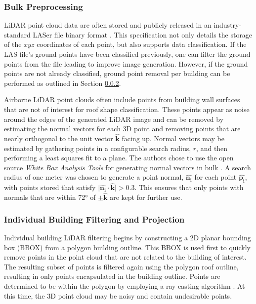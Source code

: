 \subsubsection{Bulk Preprocessing}\label{section:lidar_preprocess}
{LiDAR point cloud data are often stored and publicly released in an industry-standard LASer file binary format \cite{noauthor_laser_2018}. This specification not only details the storage of the $xyz$ coordinates of each point, but also supports data classification. If the LAS file's ground points have been classified previously, one can filter the ground points from the file leading to improve image generation.} However, if the ground points are not already classified, ground point removal per building can be performed as outlined in Section \ref{section:lidar_filtering}.

{Airborne LiDAR point clouds often include points from building wall surfaces that are not of interest for roof shape classification. These points appear as noise around the edges of the generated LiDAR image and can be removed by estimating the normal vectors for each 3D point and removing points that are nearly orthogonal to the unit vector $\boldsymbol{\hat{k}}$  facing up. Normal vectors may be estimated by gathering points in a configurable search radius, $r$, and then performing a least squares fit to a plane.  The authors chose to use the open source \emph{White Box Analysis Tools} for generating normal vectors in bulk \cite{lindsay_whitebox_2016}.  A search radius of one meter was chosen to generate a point normal, $\boldsymbol{\hat{n_i}}$ for each point $\boldsymbol{\hat{p_i}}$, with points stored that satisfy $\big| \boldsymbol{\hat{n_i}} \cdot \boldsymbol{\hat{\textbf{k}}}\big| > 0.3$. This ensures that only points with normals that are within \ang{72} of $\pm \hat{\textbf{k}}$ are kept for further use.   }


\subsubsection{Individual Building Filtering and Projection}\label{section:lidar_filtering}

Individual building LiDAR filtering begins by constructing a 2D planar bounding box (BBOX) from a polygon building outline.  This BBOX is used first to quickly remove points in the point cloud that are not related to the building of interest.  The resulting subset of points is filtered again using the polygon roof outline, resulting in only points encapsulated in the building outline. Points are determined to be within the   polygon by employing a ray casting algorithm \cite{samosky_sectionviewsystem_1993}. At this time, the 3D point cloud may be noisy and contain undesirable points. 

